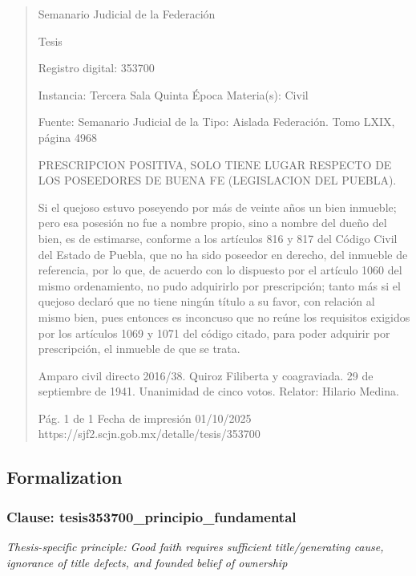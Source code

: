 \documentclass[11pt,a4paper]{article}
\begin{document}
\begin{quote}
                                                   Semanario Judicial de la Federación

                                                  Tesis

 Registro digital: 353700

 Instancia: Tercera Sala          Quinta Época                          Materia(s): Civil

                                  Fuente: Semanario Judicial de la      Tipo: Aislada
                                  Federación.
                                  Tomo LXIX, página 4968


PRESCRIPCION POSITIVA, SOLO TIENE LUGAR RESPECTO DE LOS POSEEDORES DE
BUENA FE (LEGISLACION DEL PUEBLA).


Si el quejoso estuvo poseyendo por más de veinte años un bien inmueble; pero esa posesión no fue
a nombre propio, sino a nombre del dueño del bien, es de estimarse, conforme a los artículos 816 y
817 del Código Civil del Estado de Puebla, que no ha sido poseedor en derecho, del inmueble de
referencia, por lo que, de acuerdo con lo dispuesto por el artículo 1060 del mismo ordenamiento, no
pudo adquirirlo por prescripción; tanto más si el quejoso declaró que no tiene ningún título a su
favor, con relación al mismo bien, pues entonces es inconcuso que no reúne los requisitos exigidos
por los artículos 1069 y 1071 del código citado, para poder adquirir por prescripción, el inmueble de
que se trata.


Amparo civil directo 2016/38. Quiroz Filiberta y coagraviada. 29 de septiembre de 1941. Unanimidad
de cinco votos. Relator: Hilario Medina.




                                             Pág. 1 de 1             Fecha de impresión 01/10/2025
  https://sjf2.scjn.gob.mx/detalle/tesis/353700

\end{quote}

\subsection{Formalization}

\subsubsection{Clause: tesis353700\_principio\_fundamental}

\textit{Thesis-specific principle: Good faith requires sufficient title/generating cause, ignorance of title defects, and founded belief of ownership}
\end{document}
